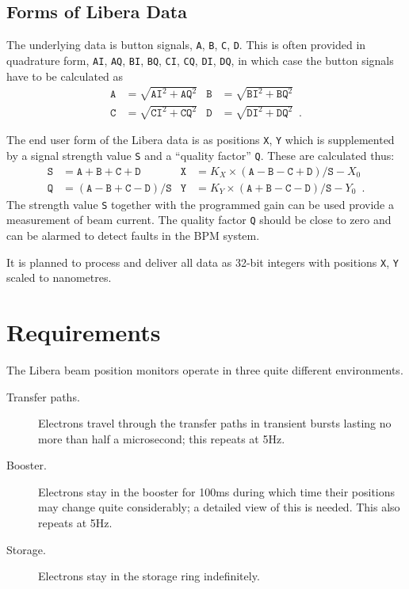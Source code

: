 \documentclass[
    a4paper,
    fleqn
]{article}
\newcommand{\id}[1]{\texttt{#1}}
\newcommand{\XY}{\id{X}, \id{Y}}
\newcommand{\ABCD}{\id{A}, \id{B}, \id{C}, \id{D}}
\newcommand{\ABCDIQ}{%
  \id{AI}, \id{AQ}, \id{BI}, \id{BQ}, 
  \id{CI}, \id{CQ}, \id{DI}, \id{DQ}}
\begin{document}
\subsection{Forms of Libera Data}

The underlying data is button signals, \ABCD.  This is often provided
in quadrature form, \ABCDIQ, in which case the button signals have to
be calculated as
\begin{align*}
\id{A} &= \sqrt{\id{AI}^2+\id{AQ}^2} &
\id{B} &= \sqrt{\id{BI}^2+\id{BQ}^2} \\
\id{C} &= \sqrt{\id{CI}^2+\id{CQ}^2} &
\id{D} &= \sqrt{\id{DI}^2+\id{DQ}^2} 
\enspace.
\end{align*}

The end user form of the Libera data is as positions \XY{} which is
supplemented by a signal strength value \id{S} and a ``quality
factor'' \id{Q}.  These are calculated thus:
\begin{align*}
\id{S} &= \id{A} + \id{B} + \id{C} + \id{D}  &
\id{X} &= 
    K_X \times (\id{A} - \id{B} - \id{C} + \id{D}) / \id{S} - X_0 \\
\id{Q} &= (\id{A} - \id{B} + \id{C} - \id{D}) / \id{S} &
\id{Y} &= 
    K_Y \times (\id{A} + \id{B} - \id{C} - \id{D}) / \id{S} - Y_0
\enspace.
\end{align*}
The strength value \id{S} together with the programmed gain can be
used provide a measurement of beam current.  The quality factor \id{Q}
should be close to zero and can be alarmed to detect faults in the BPM
system.

It is planned to process and deliver all data as 32-bit integers with
positions \XY{} scaled to nanometres.


\section{Requirements}

The Libera beam position monitors operate in three quite different
environments.
\begin{description}
\item[Transfer paths.]  Electrons travel through the transfer paths in
  transient bursts lasting no more than half a microsecond; this
  repeats at 5Hz.
\item[Booster.]  Electrons stay in the booster for 100ms during which
  time their positions may change quite considerably;  a detailed view
  of this is needed.  This also repeats at 5Hz.
\item[Storage.]  Electrons stay in the storage ring indefinitely.
\end{description}
\end{document}

